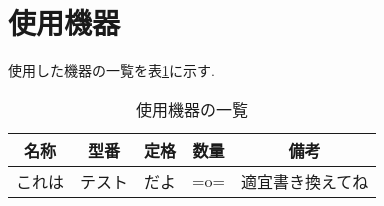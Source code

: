 \section{使用機器}
\label{sec:equipments}
使用した機器の一覧を表\ref{tab:equipments}に示す.
\begin{table}[htbp]
    \centering
    \caption{使用機器の一覧}
    \label{tab:equipments}
    \begin{tabular}{|l|l|c|r|c|}
        \hline
        \multicolumn{1}{|c|}{名称} & \multicolumn{1}{c|}{型番} & 定格 & \multicolumn{1}{c|}{数量} & \multicolumn{1}{c|}{備考} \\ \hline\hline
        これは                     & テスト                    & だよ & =o=                       & 適宜書き換えてね          \\ \hline
    \end{tabular}
\end{table}
